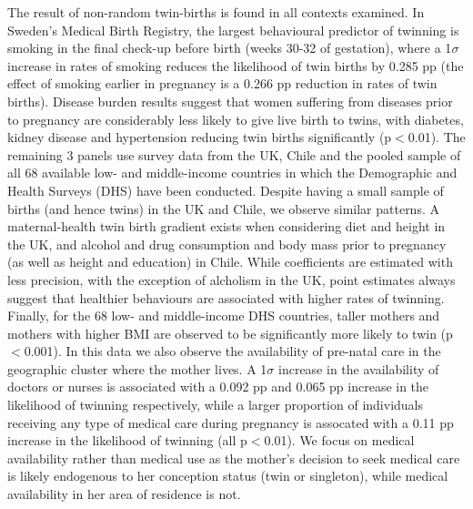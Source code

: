 \documentclass{nature}
\begin{document}
\begin{linenumbers}
The result of non-random twin-births is found in all contexts examined. In Sweden's Medical Birth Registry, the largest behavioural predictor of twinning is smoking in the final check-up before birth (weeks 30-32 of gestation), where a 1$\sigma$ increase in rates of smoking reduces the likelihood of twin births by 0.285 pp (the effect of smoking earlier in pregnancy is a 0.266 pp reduction in rates of twin births).  Disease burden results suggest that women suffering from diseases prior to pregnancy are considerably less likely to give live birth to twins, with diabetes, kidney disease and hypertension reducing twin births significantly (p$<$0.01).  The remaining 3 panels use survey data from the UK, Chile and the pooled sample of all 68 available low- and middle-income countries in which the Demographic and Health Surveys (DHS) have been conducted.  Despite having a small sample of births (and hence twins) in the UK and Chile, we observe similar patterns.  A maternal-health twin birth gradient exists when considering diet and height in the UK, and alcohol and drug consumption and body mass prior to pregnancy (as well as height and education) in Chile.  While coefficients are estimated with less precision, with the exception of alcholism in the UK, point estimates always suggest that healthier behaviours are associated with higher rates of twinning.  Finally, for the 68 low- and middle-income DHS countries, taller mothers and mothers with higher BMI are observed to be significantly more likely to twin (p$<$0.001).  In this data we also observe the availability of pre-natal care in the geographic cluster where the mother lives.  A 1$\sigma$ increase in the availability of doctors or nurses is associated with a 0.092 pp and 0.065 pp increase in the likelihood of twinning respectively, while a larger proportion of individuals receiving any type of medical care during pregnancy is assocated with a 0.11 pp increase in the likelihood of twinning (all p$<$0.01).  We focus on medical availability rather than medical use as the mother's decision to seek medical care is likely endogenous to her conception status (twin or singleton), while medical availability in her area of residence is not.%


\end{linenumbers}
\end{document}
